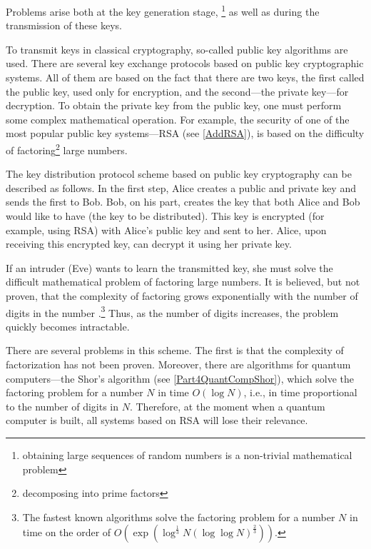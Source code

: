 Problems arise both at the key generation stage, \footnote{obtaining large sequences of random numbers is a non-trivial mathematical problem} as well as during the transmission of these keys.

To transmit keys in classical cryptography, so-called public key algorithms are used. There are several key exchange protocols based on public key cryptographic systems. All of them are based on the fact that there are two keys, the first called the public key, used only for encryption, and the second—the private key—for decryption. To obtain the private key from the public key, one must perform some complex mathematical operation. For example, the security of one of the most popular public key systems—RSA (see \ref{AddRSA}),
is based on the difficulty of factoring\footnote{decomposing into prime factors} large numbers.

The key distribution protocol scheme based on public key cryptography can be described as follows. In the first step, Alice creates a public and private key and sends the first to Bob. Bob, on his part, creates the key that both Alice and Bob would like to have (the key to be distributed). This key is encrypted (for example, using RSA) with Alice's public key and sent to her. Alice, upon receiving this encrypted key, can decrypt it using her private key.

If an intruder (Eve) wants to learn the transmitted key, she must solve the difficult mathematical problem of factoring large numbers. It is believed, but not proven, that the complexity of factoring grows exponentially with the number of digits in the number
\cite{bPhisQuantInfo}.\footnote{The fastest known algorithms solve the factoring problem for a number $N$ in time on the order of $O\left(\exp\left(\log^{\frac{1}{3}}N \left(\log \log N\right)^{\frac{2}{3}}\right)\right)$.} 
Thus, as the number of digits increases, the problem quickly becomes intractable.

There are several problems in this scheme. The first is that the complexity of factorization has not been proven. Moreover, there are algorithms for quantum computers—the Shor's algorithm (see \ref{Part4QuantCompShor}), which solve the factoring problem for a number $N$ in time $O\left(\log N\right)$, i.e., in time proportional to the number of digits in $N$. Therefore, at the moment when a quantum computer is built, all systems based on RSA  will lose their relevance.

